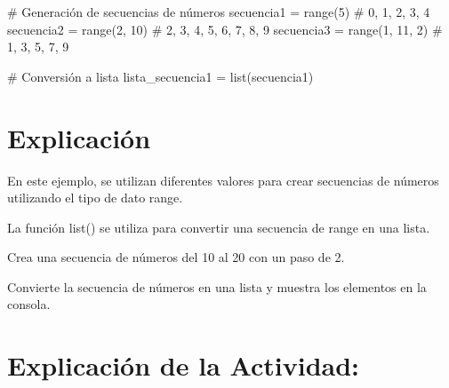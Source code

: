 \documentclass[
  a4paper,
  DIV=11,
  numbers=noendperiod,
  onepage,
  openany]{scrreprt}
\newenvironment{Shaded}{\begin{snugshade}}{\end{snugshade}}
\newcommand{\BuiltInTok}[1]{\textcolor[rgb]{0.00,0.23,0.31}{#1}}
\newcommand{\CommentTok}[1]{\textcolor[rgb]{0.37,0.37,0.37}{#1}}
\newcommand{\DecValTok}[1]{\textcolor[rgb]{0.68,0.00,0.00}{#1}}
\newcommand{\NormalTok}[1]{\textcolor[rgb]{0.00,0.23,0.31}{#1}}
\newcommand{\OperatorTok}[1]{\textcolor[rgb]{0.37,0.37,0.37}{#1}}
\begin{document}
\begin{Shaded}
\begin{Highlighting}[]
\CommentTok{\# Generación de secuencias de números}
\NormalTok{secuencia1 }\OperatorTok{=} \BuiltInTok{range}\NormalTok{(}\DecValTok{5}\NormalTok{)          }\CommentTok{\# 0, 1, 2, 3, 4}
\NormalTok{secuencia2 }\OperatorTok{=} \BuiltInTok{range}\NormalTok{(}\DecValTok{2}\NormalTok{, }\DecValTok{10}\NormalTok{)      }\CommentTok{\# 2, 3, 4, 5, 6, 7, 8, 9}
\NormalTok{secuencia3 }\OperatorTok{=} \BuiltInTok{range}\NormalTok{(}\DecValTok{1}\NormalTok{, }\DecValTok{11}\NormalTok{, }\DecValTok{2}\NormalTok{)   }\CommentTok{\# 1, 3, 5, 7, 9}

\CommentTok{\# Conversión a lista}
\NormalTok{lista\_secuencia1 }\OperatorTok{=} \BuiltInTok{list}\NormalTok{(secuencia1)}
\end{Highlighting}
\end{Shaded}

\hypertarget{explicaciuxf3n-23}{%
\section{Explicación}\label{explicaciuxf3n-23}}

En este ejemplo, se utilizan diferentes valores para crear secuencias de
números utilizando el tipo de dato range.

La función list() se utiliza para convertir una secuencia de range en
una lista.

\begin{tcolorbox}[enhanced jigsaw, colbacktitle=quarto-callout-important-color!10!white, toprule=.15mm, leftrule=.75mm, titlerule=0mm, opacityback=0, rightrule=.15mm, opacitybacktitle=0.6, breakable, left=2mm, coltitle=black, title=\textcolor{quarto-callout-important-color}{\faExclamation}\hspace{0.5em}{Actividad Práctica:}, toptitle=1mm, bottomtitle=1mm, arc=.35mm, bottomrule=.15mm, colback=white, colframe=quarto-callout-important-color-frame]

Crea una secuencia de números del 10 al 20 con un paso de 2.

Convierte la secuencia de números en una lista y muestra los elementos
en la consola.

\end{tcolorbox}

\hypertarget{explicaciuxf3n-de-la-actividad-21}{%
\section{Explicación de la
Actividad:}\label{explicaciuxf3n-de-la-actividad-21}}
\end{document}
